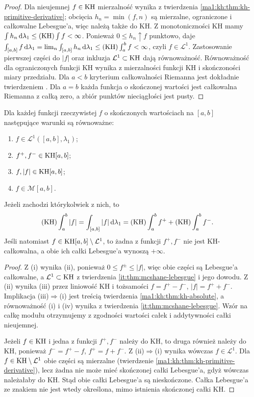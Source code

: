 \begin{proof}
Dla nieujemnej $f\in\mathrm{KH}$ mierzalność wynika z twierdzenia \ref{ma1:kh:thm:kh-primitive-derivative}; obcięcia $h_n=\min(f,n)$ są mierzalne, ograniczone i całkowalne Lebesgue'a, więc należą także do KH. Z monotoniczności KH mamy $\int h_n\,\mathrm d\lambda_1\le(\mathrm{KH})\int f<\infty$. Ponieważ $0\le h_n\uparrow f$ punktowo,
daje $\int_{[a,b]}f\,\mathrm d\lambda_1=\lim_n\int_{[a,b]}h_n\,\mathrm d\lambda_1
\le(\mathrm{KH})\int_a^b f<\infty$, czyli $f\in\mathcal L^1$. Zastosowanie pierwszej części do $|f|$ oraz inkluzja $\mathcal L^1\subset\mathrm{KH}$ dają równoważność. Równoważność dla ograniczonych funkcji KH wynika z mierzalności funkcji KH i skończoności miary przedziału. Dla $a<b$ kryterium całkowalności Riemanna jest dokładnie twierdzeniem . Dla $a=b$ każda funkcja o skończonej wartości jest całkowalna Riemanna z całką zero, a zbiór punktów nieciągłości jest pusty.
\end{proof}
\begin{wniosek}
\label{it:cor:hk-positive-negative-integrability}
Dla każdej funkcji rzeczywistej $f$ o skończonych
wartościach na $[a,b]$ następujące warunki są równoważne:
\begin{enumerate}[label=(\roman*)]
\item $f\in\mathcal L^1([a,b],\lambda_1)$;
\item $f^+,f^-\in\mathrm{KH}[a,b]$;
\item $f,|f|\in\mathrm{KH}[a,b]$;
\item $f\in\mathcal M[a,b]$.
\end{enumerate}
Jeżeli zachodzi którykolwiek z nich, to
\[
 (\mathrm{KH})\int_a^b|f|=
 \int_{[a,b]}|f|\,\mathrm d\lambda_1
 =(\mathrm{KH})\int_a^b f^++(\mathrm{KH})\int_a^b f^-.
\]
Jeśli natomiast $f\in\mathrm{KH}[a,b]\setminus\mathcal L^1$,
to żadna z funkcji $f^+,f^-$ nie jest KH-całkowalna,
a obie ich całki Lebesgue'a wynoszą $+\infty$.
\end{wniosek}
\begin{proof}
Z (i) wynika (ii), ponieważ $0\le f^\pm\le|f|$,
więc obie części są Lebesgue'a całkowalne, a
$\mathcal L^1\subset\mathrm{KH}$ z twierdzenia
\ref{it:thm:mcshane-lebesgue} i jego dowodu.
Z (ii) wynika (iii) przez liniowość KH i tożsamości
$f=f^+-f^-$, $|f|=f^++f^-$. Implikacja
(iii)$\Rightarrow$(i) jest treścią twierdzenia
\ref{ma1:kh:thm:kh-absolute}, a równoważność
(i) i (iv) wynika z twierdzenia
\ref{it:thm:mcshane-lebesgue}. Wzór na całkę modułu
otrzymujemy z zgodności wartości całek i addytywności
całki nieujemnej.

Jeżeli $f\in\mathrm{KH}$ i jedna z funkcji $f^+,f^-$
należy do KH, to druga również należy do KH,
ponieważ $f^-=f^+-f$, $f^+=f+f^-$.
Z (ii)$\Rightarrow$(i) wynika wówczas $f\in\mathcal L^1$.
Dla $f\in\mathrm{KH}\setminus\mathcal L^1$ obie części są
mierzalne (twierdzenie \ref{ma1:kh:thm:kh-primitive-derivative}),
lecz żadna nie może mieć skończonej całki Lebesgue'a,
gdyż wówczas należałaby do KH. Stąd obie całki
Lebesgue'a są nieskończone. Całka Lebesgue'a ze
znakiem nie jest wtedy określona, mimo istnienia
skończonej całki KH.
\end{proof}


